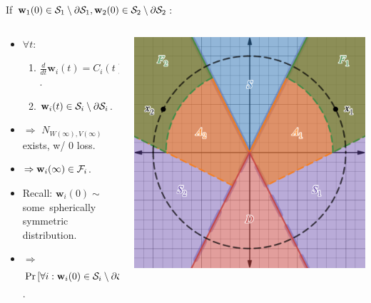 \documentclass[handout,usenames,dvipsnames]{beamer} %
\newcommand{\bx}{\mathbf{x}}
\newcommand{\bw}{\mathbf{w}}
\newcommand{\cf}{{\cal F}}
\newcommand{\cs}{{\cal S}}
\begin{document}
\begin{frame}
    If $\bw_1(0) \in \cs_1 \setminus \partial \cs_1, \bw_2(0) \in \cs_2 \setminus \partial \cs_2$:
    \begin{columns}[T]
        \begin{column}{0.55\textwidth}
            \begin{itemize}[<+->]
                \item $\forall t:$
                \begin{enumerate}
                    \item $\frac{d}{dt} \bw_i(t) = C_i(t) \bx_i, C_i(t) \geq 0$.
                    \item $\bw_i(t) \in \cs_i \setminus \partial \cs_i$.
                \end{enumerate}
                \item $\Rightarrow$ $N_{W(\infty),V(\infty)}$ exists, w/ $0$ loss.
                \item $\Rightarrow \bw_i(\infty) \in \cf_i$.
                \item Recall: $\bw_i(0) \sim$ some~spherically symmetric distribution.
                \item $\Rightarrow$ $\Pr \left[ \forall i : \bw_i(0) \in \cs_i \setminus \partial \cs_i \right] \ge 2 \cdot \left(\frac{\measuredangle(\bx_1,\bx_2)}{2\pi} \right)^2$.
            \end{itemize}
        \end{column}

        \begin{column}{0.45\textwidth}
            \begin{center}
                \includegraphics[width=\textwidth]{figures/F_and_A_regions.png}%
            \end{center}
        \end{column}
    \end{columns}
    

\end{frame}
\end{document}
